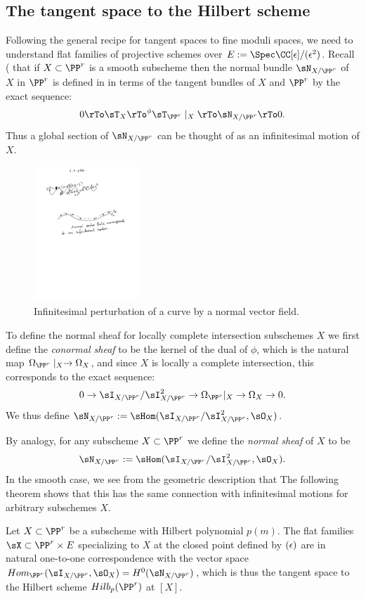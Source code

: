 \subsection{The tangent space to the Hilbert scheme}\label{tan hilbert section}

Following the general recipe for tangent spaces to fine moduli spaces, we need to understand flat families
of projective schemes over $E := \Spec \CC[\eps]/(\eps^2)$. Recall (\cite[p. 182]{Hartshorne1977} that if $X\subset \PP^r$ is a smooth subscheme then
 the normal bundle $\sN_{X/\PP^r}$ of $X$ in $\PP^r$ is defined in in terms of the tangent bundles
 of $X$ and $\PP^r$ by the exact sequence: 
$$
0\rTo \sT_X \rTo^{\phi} \sT_{\PP^r}\mid_X \rTo \sN_{X/\PP^r} \rTo 0.
$$
Thus a global section of 
$\sN_{X/\PP^r}$
can be thought of as an infinitesimal motion of $X$.

\begin{figure}
 \caption{Infinitesimal perturbation of a curve by a normal vector field.}
\centerline {\includegraphics[height=2in]{"Fig6.0.pdf"}}
\end{figure}

To define the normal sheaf for locally complete intersection subschemes $X$ we first define the \emph{conormal sheaf}
to be the kernel of the dual  of $\phi$, which is the natural map $\Omega_{\PP^r}\mid_X \to \Omega_X$,
and since $X$ is locally a complete intersection, this corresponds to the exact sequence:
$$
0\to \sI_{X/\PP^r}/\sI_{X/\PP^r}^2 \to \Omega_{\PP^r}|_X \to \Omega_X \to 0.
$$
We thus define $\sN_{X/\PP^r} := \sHom(\sI_{X/\PP^r}/\sI_{X/\PP^r}^2, \sO_X)$.

By analogy, for any subscheme $X\subset \PP^r$ we define the \emph{normal sheaf}
of $X$ to be
$$
\sN_{X/\PP^r} := \sHom(\sI_{X/\PP^r}/\sI_{X/\PP^r}^2, \sO_X).
$$
In the smooth case, we see from the geometric description that  The following theorem shows that this
has the same connection with infinitesimal motions for arbitrary subschemes $X$.


\begin{theorem}\label{tangent space of Hilb}
Let $X\subset \PP^r$ be a subscheme with Hilbert polynomial $p(m)$. The flat families 
$\sX \subset \PP^r\times E$ specializing to $X$ at the closed point defined by $(\eps)$
are in natural one-to-one correspondence with the vector space $Hom_{\PP^r}(\sI_{X/\PP^r}, \sO_X) = H^0(\sN_{X/\PP^r})$, which is thus the tangent space to the Hilbert scheme $Hilb_{p}(\PP^r)$ at $[X]$.
\end{theorem}

